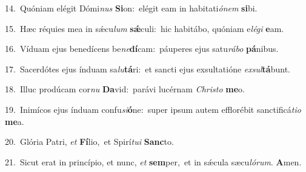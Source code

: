 {\numbfont\textcolor{\numbcolor}{14.}}~Quóniam elégit Dómi\textit{nus} \textbf{Si}\-on:~\star elégit eam in habitati\-\textit{ó}\-\textit{nem} \textbf{si}\-bi.\par
{\numbfont\textcolor{\numbcolor}{15.}}~Hæc réquies mea in sǽcu\textit{lum} \textbf{sǽ}\-culi:~\star hic habitábo, quóniam e\-\textit{lé}\-\textit{gi} \textbf{e}\-am.\par
{\numbfont\textcolor{\numbcolor}{16.}}~Víduam ejus benedícens be\-\textit{ne}\-\textbf{dí}cam:~\star páuperes ejus satu\-\textit{rá}\-\textit{bo} \textbf{pá}\-nibus.\par
{\numbfont\textcolor{\numbcolor}{17.}}~Sacerdótes ejus índuam sa\-\textit{lu}\-\textbf{tá}ri:~\star et sancti ejus exsultatióne \textit{ex}\-\textit{sul}\textbf{tá}bunt.\par
{\numbfont\textcolor{\numbcolor}{18.}}~Illuc prodúcam cor\textit{nu} \textbf{Da}\-vid:~\star parávi lucérnam \textit{Chris}\-\textit{to} \textbf{me}\-o.\par
{\numbfont\textcolor{\numbcolor}{19.}}~Inimícos ejus índuam confu\-\textit{si}\-\textbf{ó}ne:~\star super ipsum autem efflorébit sanctificá\-\textit{ti}\-\textit{o} \textbf{me}\-a.\par
{\numbfont\textcolor{\numbcolor}{20.}}~Glória Patri, \textit{et} \textbf{Fí}\-lio,~\star et Spirí\-\textit{tu}\-\textit{i} \textbf{Sanc}\-to.\par
{\numbfont\textcolor{\numbcolor}{21.}}~Sicut erat in princípio, et nunc, \textit{et} \textbf{sem}\-per,~\star et in sǽcula sæcu\-\textit{ló}\-\textit{rum}. \textbf{A}\-men.\par
